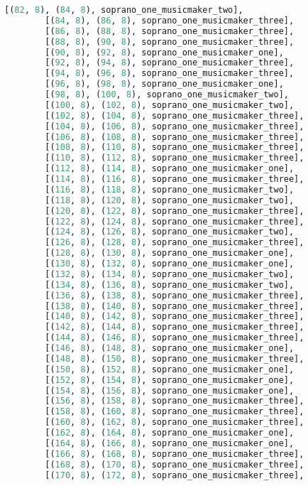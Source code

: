 \begin{lstlisting}[language=Python, caption=Invocation Source Code]
        [(82, 8), (84, 8), soprano_one_musicmaker_two],
        [(84, 8), (86, 8), soprano_one_musicmaker_three],
        [(86, 8), (88, 8), soprano_one_musicmaker_three],
        [(88, 8), (90, 8), soprano_one_musicmaker_three],
        [(90, 8), (92, 8), soprano_one_musicmaker_one],
        [(92, 8), (94, 8), soprano_one_musicmaker_three],
        [(94, 8), (96, 8), soprano_one_musicmaker_three],
        [(96, 8), (98, 8), soprano_one_musicmaker_one],
        [(98, 8), (100, 8), soprano_one_musicmaker_two],
        [(100, 8), (102, 8), soprano_one_musicmaker_two],
        [(102, 8), (104, 8), soprano_one_musicmaker_three],
        [(104, 8), (106, 8), soprano_one_musicmaker_three],
        [(106, 8), (108, 8), soprano_one_musicmaker_three],
        [(108, 8), (110, 8), soprano_one_musicmaker_three],
        [(110, 8), (112, 8), soprano_one_musicmaker_three],
        [(112, 8), (114, 8), soprano_one_musicmaker_one],
        [(114, 8), (116, 8), soprano_one_musicmaker_three],
        [(116, 8), (118, 8), soprano_one_musicmaker_two],
        [(118, 8), (120, 8), soprano_one_musicmaker_two],
        [(120, 8), (122, 8), soprano_one_musicmaker_three],
        [(122, 8), (124, 8), soprano_one_musicmaker_three],
        [(124, 8), (126, 8), soprano_one_musicmaker_two],
        [(126, 8), (128, 8), soprano_one_musicmaker_three],
        [(128, 8), (130, 8), soprano_one_musicmaker_one],
        [(130, 8), (132, 8), soprano_one_musicmaker_one],
        [(132, 8), (134, 8), soprano_one_musicmaker_two],
        [(134, 8), (136, 8), soprano_one_musicmaker_two],
        [(136, 8), (138, 8), soprano_one_musicmaker_three],
        [(138, 8), (140, 8), soprano_one_musicmaker_three],
        [(140, 8), (142, 8), soprano_one_musicmaker_three],
        [(142, 8), (144, 8), soprano_one_musicmaker_three],
        [(144, 8), (146, 8), soprano_one_musicmaker_three],
        [(146, 8), (148, 8), soprano_one_musicmaker_one],
        [(148, 8), (150, 8), soprano_one_musicmaker_three],
        [(150, 8), (152, 8), soprano_one_musicmaker_one],
        [(152, 8), (154, 8), soprano_one_musicmaker_one],
        [(154, 8), (156, 8), soprano_one_musicmaker_one],
        [(156, 8), (158, 8), soprano_one_musicmaker_three],
        [(158, 8), (160, 8), soprano_one_musicmaker_three],
        [(160, 8), (162, 8), soprano_one_musicmaker_three],
        [(162, 8), (164, 8), soprano_one_musicmaker_one],
        [(164, 8), (166, 8), soprano_one_musicmaker_one],
        [(166, 8), (168, 8), soprano_one_musicmaker_three],
        [(168, 8), (170, 8), soprano_one_musicmaker_three],
        [(170, 8), (172, 8), soprano_one_musicmaker_three],

\end{lstlisting}
